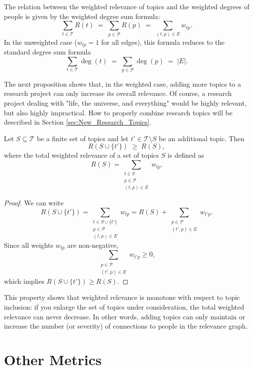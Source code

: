 The relation between the weighted relevance of topics and the weighted degrees of people is given by the weighted degree sum formula:
\[
\sum_{t \in \mathcal{T}} R(t) \;=\; \sum_{p \in \mathcal{P}} R(p) \;=\; \sum_{(t,p) \in E} w_{tp}.
\]
In the unweighted case ($w_{tp} = 1$ for all edges), this formula reduces to the standard degree sum formula
\[
\sum_{t \in \mathcal{T}} \deg(t) \;=\; \sum_{p \in \mathcal{P}} \deg(p) \;=\; |E|.
\]

The next proposition shows that, in the weighted case, adding more topics to a research project can only increase its overall relevance. Of course, a research project dealing with "life, the universe, and everything" would be highly relevant, but also highly impractical. How to properly combine research topics will be described in Section \ref{sec:New_Research_Topics}.

\begin{proposition}
Let $S \subseteq \mathcal{T}$ be a finite set of topics and let $t' \in \mathcal{T} \setminus S$ be an additional topic. Then
\[
R(S \cup \{t'\}) \;\geq\; R(S),
\]
where the total weighted relevance of a set of topics $S$ is defined as
\[
R(S) = \sum_{\substack{t \in S \\ p \in \mathcal{P} \\ (t,p) \in E}} w_{tp}.
\]
\end{proposition}
\begin{proof}
We can write
\[
R(S \cup \{t'\}) = \sum_{\substack{t \in S \cup \{t'\} \\ p \in \mathcal{P} \\ (t,p) \in E}} w_{tp}
= R(S) + \sum_{\substack{p \in \mathcal{P} \\ (t',p) \in E}} w_{t'p}.
\]
Since all weights $w_{tp}$ are non-negative,
\[
\sum_{\substack{p \in \mathcal{P} \\ (t',p) \in E}} w_{t'p} \geq 0,
\]
which implies $R(S \cup \{t'\}) \geq R(S)$.
\end{proof}

This property shows that weighted relevance is monotone with respect to topic inclusion: if you enlarge the set of topics under consideration, the total weighted relevance can never decrease. In other words, adding topics can only maintain or increase the number (or severity) of connections to people in the relevance graph.

%
%

\section{Other Metrics}


